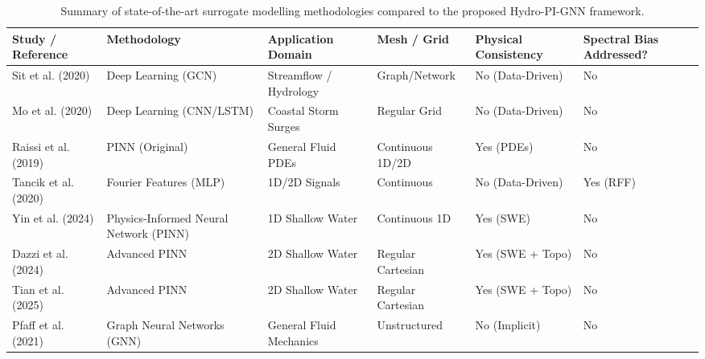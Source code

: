 \begin{table}[htbp]
    \centering
    \caption{Summary of state-of-the-art surrogate modelling methodologies compared to the proposed Hydro-PI-GNN framework.}
    \label{tab:lit_summary}
    \vspace{0.2cm}
    \scriptsize
    \noindent\begin{tabularx}{\textwidth}{|>{\raggedright\arraybackslash\hspace{0pt}}X|>{\raggedright\arraybackslash\hspace{0pt}}X|>{\raggedright\arraybackslash\hspace{0pt}}X|>{\raggedright\arraybackslash\hspace{0pt}}X|>{\raggedright\arraybackslash\hspace{0pt}}X|>{\raggedright\arraybackslash\hspace{0pt}}X|}
    \hline
    \textbf{Study / Reference} & \textbf{Methodology} & \textbf{Application Domain} & \textbf{Mesh / Grid} & \textbf{Physical Consistency} & \textbf{Spectral Bias Addressed?} \\ \hline
    Sit et al. (2020) \cite{Sit2020} & Deep Learning (GCN) & Streamflow / Hydrology & Graph/Network & No \newline (Data-Driven) & No \\ \hline
    Mo et al. (2020) \cite{Mo2020} & Deep Learning (CNN/LSTM) & Coastal Storm Surges & Regular Grid & No \newline (Data-Driven) & No \\ \hline
    Raissi et al. (2019) \cite{Raissi2019} & PINN (Original) & General Fluid PDEs & Continuous 1D/2D & Yes (PDEs) & No \\ \hline
    Tancik et al. (2020) \cite{Tancik2020} & Fourier Features (MLP) & 1D/2D Signals & Continuous & No \newline (Data-Driven) & Yes (RFF) \\ \hline
    Yin et al. (2024) \cite{Yin2024} & Physics-Informed Neural Network (PINN) & 1D Shallow Water & Continuous 1D & Yes (SWE) & No \\ \hline
    Dazzi et al. (2024) \cite{Dazzi2024} & Advanced PINN & 2D Shallow Water & Regular Cartesian & Yes (SWE + Topo) & No \\ \hline
    Tian et al. (2025) \cite{Tian2025} & Advanced PINN & 2D Shallow Water & Regular Cartesian & Yes (SWE + Topo) & No \\ \hline
    Pfaff et al. (2021) \cite{Pfaff2021} & Graph Neural Networks (GNN) & General Fluid Mechanics & Unstructured & No (Implicit) & No \\ \hline

\end{tabularx}
\end{table}
